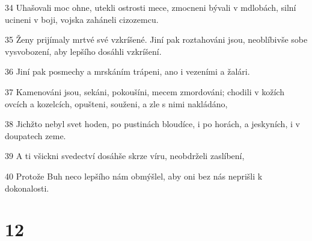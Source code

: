 \par 34 Uhašovali moc ohne, utekli ostrosti mece, zmocneni bývali v mdlobách, silní ucineni v boji, vojska zaháneli cizozemcu.
\par 35 Ženy prijímaly mrtvé své vzkríšené. Jiní pak roztahováni jsou, neoblíbivše sobe vysvobození, aby lepšího dosáhli vzkríšení.
\par 36 Jiní pak posmechy a mrskáním trápeni, ano i vezeními a žalári.
\par 37 Kamenováni jsou, sekáni, pokoušíni, mecem zmordováni; chodili v kožích ovcích a kozelcích, opušteni, souženi, a zle s nimi nakládáno,
\par 38 Jichžto nebyl svet hoden, po pustinách bloudíce, i po horách, a jeskyních, i v doupatech zeme.
\par 39 A ti všickni svedectví dosáhše skrze víru, neobdrželi zaslíbení,
\par 40 Protože Buh neco lepšího nám obmýšlel, aby oni bez nás neprišli k dokonalosti.

\chapter{12}

